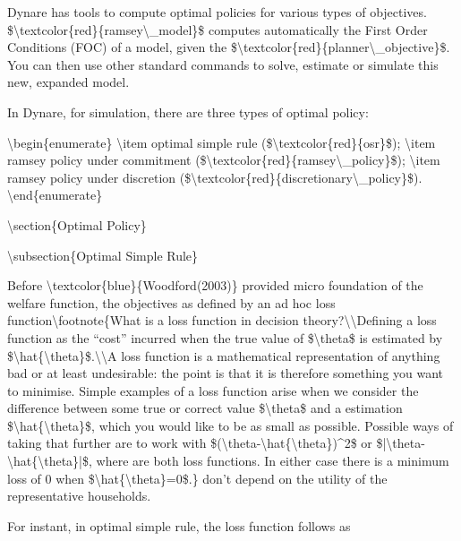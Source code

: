 \documentclass[10pt,math=newtx,citestyle=gb7714-2015,bibstyle=gb7714-2015]{elegantbook}
\begin{document}
	Dynare has tools to compute optimal policies for various types of objectives. \$\textbackslash{}textcolor\{red\}\{ramsey\textbackslash{}\_model\}\$ computes automatically the First Order Conditions (FOC) of a model, given the \$\textbackslash{}textcolor\{red\}\{planner\textbackslash{}\_objective\}\$. You can then use other standard commands to solve, estimate or simulate this new, expanded model.
	
	In Dynare, for simulation, there are three types of optimal policy:
	
	\textbackslash{}begin\{enumerate\}
	\textbackslash{}item optimal simple rule (\$\textbackslash{}textcolor\{red\}\{osr\}\$);
	\textbackslash{}item ramsey policy under commitment (\$\textbackslash{}textcolor\{red\}\{ramsey\textbackslash{}\_policy\}\$);
	\textbackslash{}item ramsey policy under discretion (\$\textbackslash{}textcolor\{red\}\{discretionary\textbackslash{}\_policy\}\$).
	\textbackslash{}end\{enumerate\}
	
	\textbackslash{}section\{Optimal Policy\}
	
	\textbackslash{}subsection\{Optimal Simple Rule\}
	
	Before \textbackslash{}textcolor\{blue\}\{Woodford(2003)\} provided micro foundation of the welfare function, the objectives as defined by an ad hoc loss function\textbackslash{}footnote\{What is a loss function in decision theory?\textbackslash{}\textbackslash{}Defining a loss function as the ``cost'' incurred when the true value of \$\textbackslash{}theta\$ is estimated by \$\textbackslash{}hat\{\textbackslash{}theta\}\$.\textbackslash{}\textbackslash{}A loss function is a mathematical representation of anything bad or at least undesirable: the point is that it is therefore something you want to minimise. Simple examples of a loss function arise when we consider the difference between some true or correct value \$\textbackslash{}theta\$ and a estimation \$\textbackslash{}hat\{\textbackslash{}theta\}\$, which you would like to be as small as possible. Possible ways of taking that further are to work with \$(\textbackslash{}theta-\textbackslash{}hat\{\textbackslash{}theta\})\^{}2\$ or \$|\textbackslash{}theta-\textbackslash{}hat\{\textbackslash{}theta\}|\$, where are both loss functions. In either case there is a minimum loss of 0 when \$\textbackslash{}hat\{\textbackslash{}theta\}=0\$.\} don't depend on the utility of the representative households.
	
	For instant, in optimal simple rule, the loss function follows as
	
\end{document}
